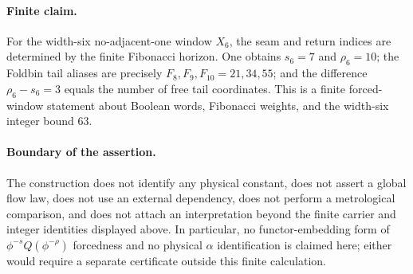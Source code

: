 \paragraph{Finite claim.}
For the width-six no-adjacent-one window $X_6$, the seam and return indices are determined by the finite Fibonacci horizon. One obtains $s_6=7$ and $\rho_6=10$; the Foldbin tail aliases are precisely $F_8,F_9,F_{10}=21,34,55$; and the difference $\rho_6-s_6=3$ equals the number of free tail coordinates. This is a finite forced-window statement about Boolean words, Fibonacci weights, and the width-six integer bound $63$.

\paragraph{Boundary of the assertion.}
The construction does not identify any physical constant, does not assert a global flow law, does not use an external dependency, does not perform a metrological comparison, and does not attach an interpretation beyond the finite carrier and integer identities displayed above. In particular, no functor-embedding form of $\phi^{-s}Q(\phi^{-\rho})$ forcedness and no physical $\alpha$ identification is claimed here; either would require a separate certificate outside this finite calculation.
